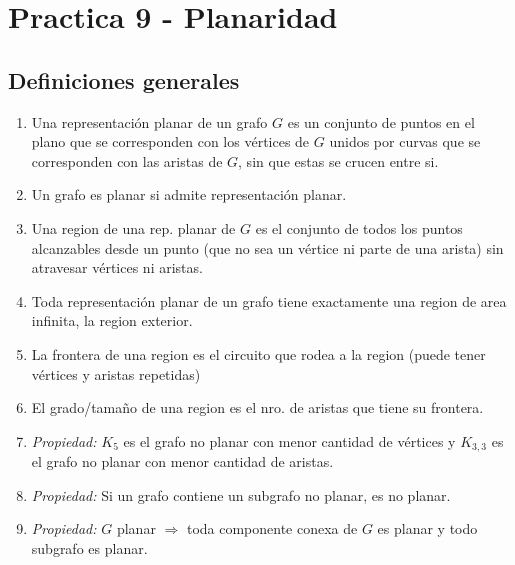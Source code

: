 \section{Practica 9 - Planaridad}
\subsection{Definiciones generales}
\begin{enumerate}
\item Una representación planar de un grafo $G$ es un conjunto de puntos en el plano que se corresponden con los vértices de $G$ unidos por curvas que se corresponden con las aristas de $G$, sin que estas se crucen entre si.
\item Un grafo es planar si admite representación planar.
\item Una region de una rep. planar de $G$ es el conjunto de todos los puntos alcanzables desde un punto (que no sea un vértice ni parte de una arista) sin atravesar vértices ni aristas.
\item Toda representación planar de un grafo tiene exactamente una region de area infinita, la region exterior.
\item La frontera de una region es el circuito que rodea a la region (puede tener vértices y aristas repetidas)
\item El grado/tamaño de una region es el nro. de aristas que tiene su frontera.
\item \textit{Propiedad:} $K_{5}$ es el grafo no planar con menor cantidad de vértices y $K_{3,3}$ es el grafo no planar con menor cantidad de aristas.
\item \textit{Propiedad:} Si un grafo contiene un subgrafo no planar, es no planar.
\item \textit{Propiedad:} $G$ planar $\Rightarrow$ toda componente conexa de $G$ es planar y todo subgrafo es planar.
\end{enumerate}

